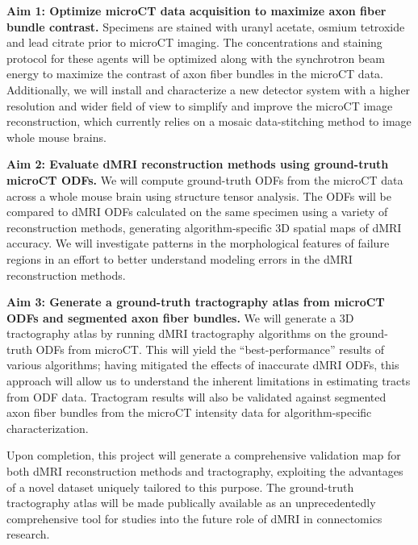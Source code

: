 \documentclass[11pt]{article}
\begin{document}
\noindent\textbf{Aim 1: Optimize microCT data acquisition to maximize axon fiber bundle contrast.}
Specimens are stained with uranyl acetate, osmium tetroxide and lead citrate
prior to microCT imaging. The concentrations and staining protocol for these
agents will be optimized along with the synchrotron beam energy to maximize the
contrast of axon fiber bundles in the microCT data. Additionally, we will
install and characterize a new detector system with a higher resolution and
wider field of view to simplify and improve the microCT image reconstruction,
which currently relies on a mosaic data-stitching method to image whole mouse
brains.

\noindent\textbf{Aim 2: Evaluate dMRI reconstruction methods using ground-truth
  microCT ODFs.}
We will compute ground-truth ODFs from the microCT data across a whole mouse
brain using structure tensor analysis. The ODFs will be compared to dMRI ODFs
calculated on the same specimen using a variety of reconstruction methods,
generating algorithm-specific 3D spatial maps of dMRI accuracy. We will
investigate patterns in the morphological features of failure regions in
an effort to better understand modeling errors in the dMRI reconstruction
methods. 

\noindent\textbf{Aim 3: Generate a ground-truth tractography atlas from microCT
  ODFs and segmented axon fiber bundles.} We will generate a 3D tractography atlas
by running dMRI tractography algorithms on the ground-truth ODFs from
microCT. This will yield the ``best-performance'' results of various algorithms;
having mitigated the effects of inaccurate dMRI ODFs, this approach will allow
us to understand the inherent limitations in estimating tracts from ODF data.
Tractogram results will also be validated against segmented axon fiber bundles
from the microCT intensity data for algorithm-specific characterization.

Upon completion, this project will generate a comprehensive validation map for
both dMRI reconstruction methods and tractography, exploiting the advantages of
a novel dataset uniquely tailored to this purpose. The ground-truth tractography
atlas will be made publically available as an unprecedentedly comprehensive tool
for studies into the future role of dMRI in connectomics research.
\end{document}
